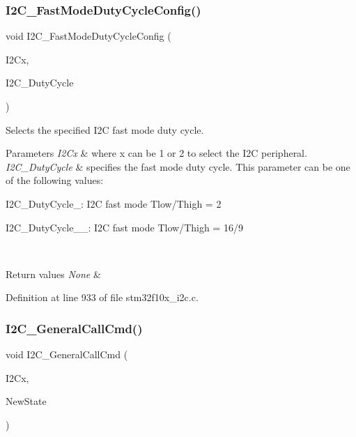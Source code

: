 \subsubsection{\texorpdfstring{I2\+C\+\_\+\+Fast\+Mode\+Duty\+Cycle\+Config()}{I2C\_FastModeDutyCycleConfig()}}
{\footnotesize\ttfamily void I2\+C\+\_\+\+Fast\+Mode\+Duty\+Cycle\+Config (\begin{DoxyParamCaption}\item[{\hyperlink{struct_i2_c___type_def}{I2\+C\+\_\+\+Type\+Def} $\ast$}]{I2\+Cx,  }\item[{uint16\+\_\+t}]{I2\+C\+\_\+\+Duty\+Cycle }\end{DoxyParamCaption})}



Selects the specified I2C fast mode duty cycle. 


\begin{DoxyParams}{Parameters}
{\em I2\+Cx} & where x can be 1 or 2 to select the I2C peripheral. \\
\hline
{\em I2\+C\+\_\+\+Duty\+Cycle} & specifies the fast mode duty cycle. This parameter can be one of the following values\+: \begin{DoxyItemize}
\item I2\+C\+\_\+\+Duty\+Cycle\+\_\+: I2C fast mode Tlow/\+Thigh = 2 \item I2\+C\+\_\+\+Duty\+Cycle\+\_\+\_\+: I2C fast mode Tlow/\+Thigh = 16/9 \end{DoxyItemize}
\\
\hline
\end{DoxyParams}

\begin{DoxyRetVals}{Return values}
{\em None} & \\
\hline
\end{DoxyRetVals}


Definition at line 933 of file stm32f10x\+\_\+i2c.\+c.

\mbox{\label{group___i2_c___exported___functions_ga65c740fc8d7b3b9f15cc432d8699d471}} 
\subsubsection{\texorpdfstring{I2\+C\+\_\+\+General\+Call\+Cmd()}{I2C\_GeneralCallCmd()}}
{\footnotesize\ttfamily void I2\+C\+\_\+\+General\+Call\+Cmd (\begin{DoxyParamCaption}\item[{\hyperlink{struct_i2_c___type_def}{I2\+C\+\_\+\+Type\+Def} $\ast$}]{I2\+Cx,  }\item[{\hyperlink{group___exported__types_gac9a7e9a35d2513ec15c3b537aaa4fba1}{Functional\+State}}]{New\+State }\end{DoxyParamCaption})}



